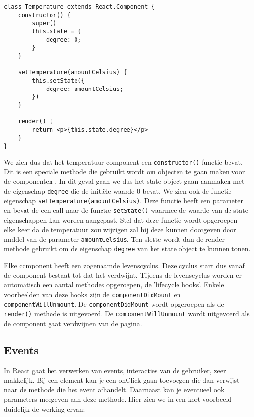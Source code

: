 \begin{lstlisting}[frame=single, caption=Het temperature component met de bijhorende state.]
class Temperature extends React.Component {
	constructor() {
		super()
		this.state = {
			degree: 0;
		}
	}
	
	setTemperature(amountCelsius) {
		this.setState({
			degree: amountCelsius;
		})
	}

	render() {
		return <p>{this.state.degree}</p>
	}
}
\end{lstlisting}

We zien dus dat het temperatuur component een \lstinline[basicstyle=\ttfamily\color{red}]|constructor()| functie bevat. Dit is een speciale methode die gebruikt wordt om objecten te gaan maken voor de componenten \autocite{Chima2017}. In dit geval gaan we dus het state object gaan aanmaken met de eigenschap \lstinline[basicstyle=\ttfamily\color{red}]|degree| die de initiële waarde 0 bevat. We zien ook de functie eigenschap \lstinline[basicstyle=\ttfamily\color{red}]|setTemperature(amountCelsius)|. Deze functie heeft een parameter en bevat de een call naar de functie \lstinline[basicstyle=\ttfamily\color{red}]|setState()| waarmee de waarde van de state eigenschappen kan worden aangepast. Stel dat deze functie wordt opgeroepen elke keer da de temperatuur zou wijzigen zal hij deze kunnen doorgeven door middel van de parameter \lstinline[basicstyle=\ttfamily\color{red}]|amountCelsius|. Ten slotte wordt dan de render methode gebruikt om de eigenschap \lstinline[basicstyle=\ttfamily\color{red}]|degree|
van het state object te kunnen tonen.

Elke component heeft een zogenaamde levenscyclus. Deze cyclus start dus vanaf de component bestaat tot dat het verdwijnt. Tijdens de levenscyclus worden er automatisch een aantal methodes opgeroepen, de 'lifecycle hooks'. Enkele voorbeelden van deze hooks zijn de \lstinline[basicstyle=\ttfamily\color{red}]|componentDidMount| en \lstinline[basicstyle=\ttfamily\color{red}]|componentWillUnmount|. De \lstinline[basicstyle=\ttfamily\color{red}]|componentDidMount| wordt opgeroepen als de \lstinline[basicstyle=\ttfamily\color{red}]|render()| methode is uitgevoerd. De \lstinline[basicstyle=\ttfamily\color{red}]|componentWillUnmount| wordt uitgevoerd als de component gaat verdwijnen van de pagina.

\subsection{Events}
\label{subsec:events}
In React gaat het verwerken van events, interacties van de gebruiker, zeer makkelijk. Bij een element kan je een onClick gaan toevoegen die dan verwijst naar de methode die het event afhandelt. Daarnaast kan je eventueel ook parameters meegeven aan deze methode. Hier zien we in een kort voorbeeld duidelijk de werking ervan:

